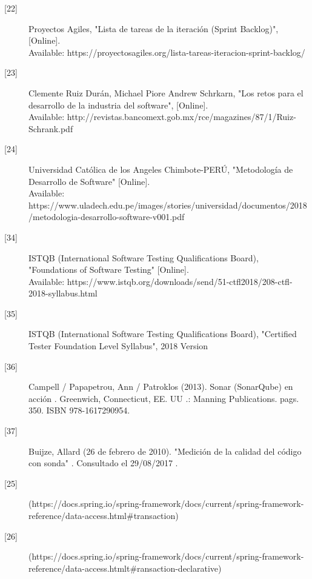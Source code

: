 \begin{description}
		\item[\hypertarget{b22}{[22]}] Proyectos Agiles, "Lista de tareas de la iteración (Sprint Backlog)", [Online].\\ Available: https://proyectosagiles.org/lista-tareas-iteracion-sprint-backlog/
		
		\item[\hypertarget{b23}{[23]}] Clemente Ruiz Durán, Michael Piore
		Andrew Schrkarn, "Los retos para el desarrollo
		de la industria del software", [Online].\\ Available: http://revistas.bancomext.gob.mx/rce/magazines/87/1/Ruiz-Schrank.pdf

		\item[\hypertarget{b24}{[24]}] Universidad Católica de los Angeles Chimbote-PERÚ, "Metodología de Desarrollo de Software"  [Online].\\ Available: https://www.uladech.edu.pe/images/stories/universidad/documentos/2018/metodologia-desarrollo-software-v001.pdf
		
		\item[\hypertarget{b34}{[34]}] ISTQB (International Software Testing Qualifications Board), "Foundations of Software Testing" [Online].\\ Available: 
		https://www.istqb.org/downloads/send/51-ctfl2018/208-ctfl-2018-syllabus.html
		
		\item[\hypertarget{b35}{[35]}] ISTQB (International Software Testing Qualifications Board), "Certified Tester
		Foundation Level Syllabus", 2018 Version 
		
		\item[\hypertarget{b36}{[36]}] Campell / Papapetrou, Ann / Patroklos (2013). Sonar (SonarQube) en acción . Greenwich, Connecticut, EE. UU .: Manning Publications. pags. 350. ISBN 978-1617290954.
		
		\item[\hypertarget{b37}{[37]}] Buijze, Allard (26 de febrero de 2010). "Medición de la calidad del código con sonda" . Consultado el 29/08/2017 .
				
		\item[\hypertarget{b25}{[25]}] (https://docs.spring.io/spring-framework/docs/current/spring-framework-reference/data-access.html\#transaction)
		
		\item[\hypertarget{b26}{[26]}] (https://docs.spring.io/spring-framework/docs/current/spring-framework-reference/data-access.htmlt\#ransaction-declarative)
		

\end{description}

